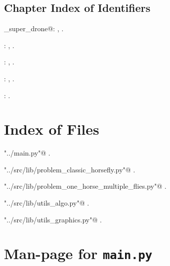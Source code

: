 \documentclass[11.5pt]{report}
\begin{document}
\section{Chapter Index of Identifiers}

{\small\begin{list}{}{\setlength{\itemsep}{-\parsep}\setlength{\itemindent}{-\leftmargin}}
\item \verb@algo_super_drone@: , \underline{}.
\item \verb@chunkify@: , \underline{}.
\item \verb@clearAllStates@: , \underline{}.
\item \verb@getTour@: , \underline{}.
\item \verb@wrapperkeyPressHandler@: \underline{}.
\end{list}} 

\newpage
\begin{appendices}
\chapter{Index of Files}

{\small\begin{list}{}{\setlength{\itemsep}{-\parsep}\setlength{\itemindent}{-\leftmargin}}
\item \verb@"../main.py"@ {\footnotesize {\NWtxtDefBy} .}
\item \verb@"../src/lib/problem_classic_horsefly.py"@ {\footnotesize {\NWtxtDefBy} .}
\item \verb@"../src/lib/problem_one_horse_multiple_flies.py"@ {\footnotesize {\NWtxtDefBy} .}
\item \verb@"../src/lib/utils_algo.py"@ {\footnotesize {\NWtxtDefBy} .
}
\item \verb@"../src/lib/utils_graphics.py"@ {\footnotesize {\NWtxtDefBy} .
}
\end{list}}
\chapter{Man-page for \texttt{main.py}}


\end{appendices}
\end{document}
